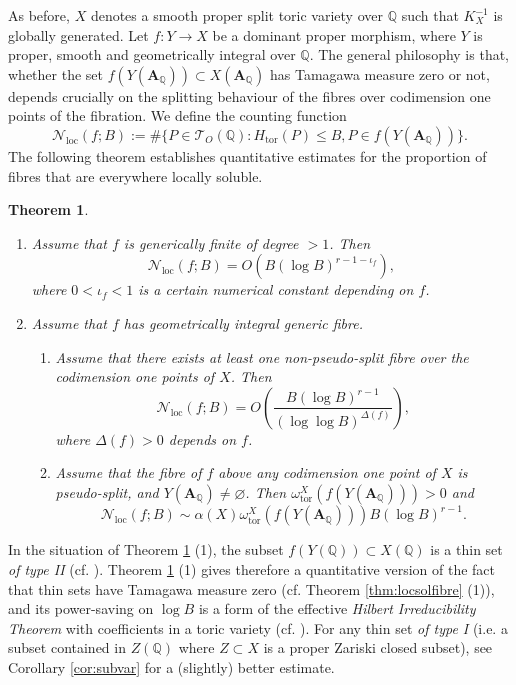 \documentclass[11pt,letterpaper]{amsart}
\newcommand{\BQ}{{\mathbb {Q}}}
\newcommand{\CN}{{\mathcal {N}}}
\newcommand{\CT}{{\mathcal {T}}}
\newcommand{\RA}{{\mathbf {A}}}
\theoremstyle{plain}
\numberwithin{equation}{section}
\newtheorem{theorem}{Theorem}[section]
\theoremstyle{definition}
\theoremstyle{remark}
\begin{document}
As before, $X$ denotes a smooth proper split toric variety over $\BQ$ such that $K_X^{-1}$ is globally generated. Let $f:Y\to X$ be a dominant proper morphism, where $Y$ is proper, smooth and geometrically integral over $\BQ$. The general philosophy is that, whether the set $f(Y(\RA_\BQ))\subset X(\RA_\BQ)$ has Tamagawa measure zero or not, depends crucially on the splitting behaviour of the fibres over codimension one points of the fibration.
We define the counting function
\begin{equation}\label{eq:countingfibration}
	\CN_{\operatorname{loc}}(f;B):=\#\{P\in\CT_{O}(\BQ):H_{\operatorname{tor}}(P)\leqslant B,P\in f(Y(\RA_\BQ))\}.
\end{equation}
The following theorem establishes quantitative estimates for the proportion of fibres that are everywhere locally soluble.
\begin{theorem}\label{thm:ratptsfibration}
	\hfill
	\begin{enumerate}
		\item Assume that $f$ is generically finite of degree $>1$. Then $$\CN_{\operatorname{loc}}(f;B)=O(B(\log B)^{r-1-\iota_{f}}),$$ where $0<\iota_{f}<1$ is a certain numerical constant depending on $f$.
	\item Assume that $f$ has geometrically integral generic fibre.
	\begin{enumerate}
		\item Assume that there exists at least one non-pseudo-split fibre over the codimension one points of $X$.  Then $$\CN_{\operatorname{loc}}(f;B)=O\left(\frac{B(\log B)^{r-1}}{(\log\log B)^{\varDelta(f)}}\right),$$ where $\varDelta(f)>0$ depends on  $f$.
		\item Assume that the fibre of $f$ above any codimension one point of $X$ is pseudo-split, and $Y(\RA_\BQ)\neq \varnothing$. Then  $\omega_{\operatorname{tor}}^X\left(f(Y(\RA_\BQ))\right)>0$ and \begin{equation}\label{eq:everylocdensity}
			\CN_{\operatorname{loc}}(f;B)\sim \alpha(X)\omega_{\operatorname{tor}}^X\left(f(Y(\RA_\BQ))\right)B(\log B)^{r-1}.
		\end{equation} 
\end{enumerate}
	\end{enumerate}
\end{theorem}
In the situation of Theorem \ref{thm:ratptsfibration} (1), the subset $f(Y(\BQ))\subset X(\BQ)$ is a thin set  \emph{of type II} (cf. \cite[\S3.1]{Serre}).
Theorem \ref{thm:ratptsfibration} (1) gives therefore a quantitative version of the fact that thin sets have Tamagawa measure zero (cf. Theorem \ref{thm:locsolfibre} (1)), and
its  power-saving on $\log B$ is a form of the effective \emph{Hilbert Irreducibility Theorem} with coefficients in a toric variety (cf. \cite[\S3.4]{Serre}). For any thin set  \emph{of type I} (i.e. a subset contained in $Z(\BQ)$ where $Z\subset X$ is a proper Zariski closed subset), see Corollary \ref{cor:subvar} for a (slightly) better estimate. 
\end{document}
